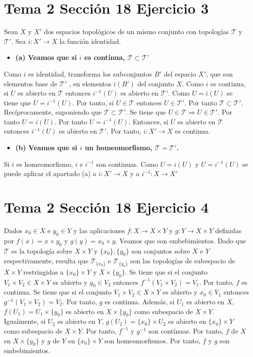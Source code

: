 \documentclass{article}
\begin{document}
\section{Tema 2 Sección 18 Ejercicio 3}
Sean $X$ y $X'$ dos espacios topológicos de un mismo conjunto con topologías $\mathcal{T}$ y $\mathcal{T}'$. Sea $i:X'\rightarrow X$ la función identidad.
\begin{itemize}
\item\bf (a) \rm Veamos que si $i$ es contínua, $\mathcal{T}\subset \mathcal{T}'$
\end{itemize}
Como $i$ es identidad, transforma los subconjuntos $B'$ del espacio $X'$, que son elementos base de $\mathcal{T}'$ , en elementos $i(B')$ del conjunto $X$. Como $i$ es continua, si $U$ es abierto en $\mathcal{T}$ entonces $i^{-1}(U)$ es abierto en $\mathcal{T}'$. Como $U=i(U)$ se tiene que $U=i^{-1}(U)$. Por tanto, si $U\in \mathcal{T}$ entonces $U\in \mathcal{T}'$. Por tanto $\mathcal{T}\subset\mathcal{T}'$. Recíprocamente, suponiendo que $\mathcal{T}\subset\mathcal{T}'$. Se tiene que $U\in \mathcal{T}\Rightarrow U\in \mathcal{T}'$. Por tanto $U=i(U)$. Por tanto $U=i^{-1}(U)$. Entonces, si $U$ es abierto en $\mathcal{T}$ entonces $i^{-1}(U)$ es abierto en $\mathcal{T}'$. Por tanto, $i:X'\rightarrow X$ es continua.
\begin{itemize}
\item\bf (b) \rm Veamos que si $i$ un homeomorfismo, $\mathcal{T}=\mathcal{T}'$.
\end{itemize}
Si $i$ es homeomorfismo, $i$ e $i^{-1}$ son continuas. Como $U=i(U)$ y $U=i^{-1}(U)$ se puede aplicar el apartado (a) a $i:X'\rightarrow X$ y a $i^{-1}:X\rightarrow X'$
\section{Tema 2 Sección 18 Ejercicio 4}
Dados $x_0\in X$ e $y_0\in Y$ y las aplicaciones $f:X\rightarrow X\times Y$ y $g:Y\rightarrow X\times Y$ definidas por $f(x)=x\times y_0$ y $g(y)=x_0\times y$. Veamos que son embebimientos.
Dado que $\mathcal{T}$ es la topología sobre $X\times Y$ y $\{x_0\},\{y_0\}$ son conjuntos sobre $X$ e $Y$ respectivamente, resulta que $\mathcal{T}_{\{x_0\}}$ e $\mathcal{T}_{\{y_0\}}$ son las topologías de subespacio de $X\times Y$ restringidas a $\{x_0\}\times Y$ y $X\times \{y_0\}$. Se tiene que si el conjunto $V_1\times V_2 \in X\times Y$ es abierto y $y_0 \in V_2$ entonces $f^{-1}(V_1\times V_2)=V_1$. Por tanto, $f$ es continua. Se tiene que si el conjunto $V_1\times V_2 \in X\times Y$ es abierto y $x_0 \in V_1$ entonces $g^{-1}(V_1\times V_2)=V_2$. Por tanto, $g$ es continua. Además, si $U_1$ es abierto en $X$, $f(U_1)=U_1\times \{y_0\}$ es abierto en $X\times \{y_0\}$ como subespacio de $X\times Y$. Igualmente, si $U_2$ es abierto en $Y$, $g(U_2)=\{x_0\}\times U_2 $ es abierto en $\{x_0\}\times Y$ como subespacio de $X\times Y$. Por tanto, $f^{-1}$ y $g^{-1}$ son contínuas. Por tanto, $f$ de $X$ en $X\times \{y_0\}$ y $g$ de $Y$ en $\{x_0\}\times Y$  son homeomorfismos. Por tanto, $f$ y $g$ son embebimientos.
\end{document}
